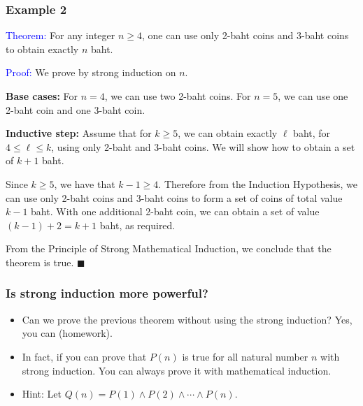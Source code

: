 \begin{frame}\frametitle{Example 2}
  \textcolor{blue}{Theorem:} For any integer $n\geq 4$, one can use only
  2-baht coins and 3-baht coins to obtain exactly $n$ baht.
  \vspace{0.1in}

  \textcolor{blue}{Proof:} We prove by strong induction on $n$.

  {\bf Base cases:} For $n=4$, we can use two 2-baht coins.  For
  $n=5$, we can use one 2-baht coin and one 3-baht coin.

  \vspace{0.125in}

  {\bf Inductive step:} Assume that for $k\geq 5$, we can obtain
  exactly $\ell$ baht, for $4\leq\ell\leq k$, using only 2-baht and
  3-baht coins.  We will show how to obtain a set of $k+1$ baht.

  Since $k\geq 5$, we have that $k-1 \geq 4$.  Therefore from the
  Induction Hypothesis, we can use only 2-baht coins and 3-baht coins
  to form a set of coins of total value $k-1$ baht.  With one
  additional 2-baht coin, we can obtain a set of value $(k-1) + 2 =
  k+1$ baht, as required.

  \vspace{0.125in}

  From the Principle of Strong Mathematical Induction, we conclude
  that the theorem is true. $\blacksquare$
\end{frame}

\begin{frame}\frametitle{Is strong induction more powerful?}
  \begin{itemize}
  \item Can we prove the previous theorem without using the strong
    induction?
    \pause Yes, you can (homework). \pause
  \item In fact, if you can prove that $P(n)$ is true for all natural
    number $n$ with strong induction.  You can always prove it with
    mathematical induction.
    \pause
  \item Hint: Let $Q(n)=P(1)\wedge P(2)\wedge\cdots\wedge P(n)$.
  \end{itemize}
\end{frame}
